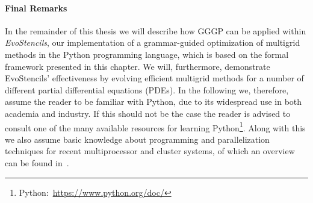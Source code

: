 \paragraph{Final Remarks}
In the remainder of this thesis we will describe how GGGP can be applied within \emph{EvoStencils}, our implementation of a grammar-guided optimization of multigrid methods in the Python programming language, which is based on the formal framework presented in this chapter.
We will, furthermore, demonstrate EvoStencils' effectiveness by evolving efficient multigrid methods for a number of different partial differential equations (PDEs).
In the following we, therefore, assume the reader to be familiar with Python, due to its widespread use in both academia and industry.
If this should not be the case the reader is advised to consult one of the many available resources for learning Python\footnote{Python:~\url{https://www.python.org/doc/}}.
Along with this we also assume basic knowledge about programming and parallelization techniques for recent multiprocessor and cluster systems, of which an overview can be found in~\cite{sterling2017high,hager2010introduction}.
